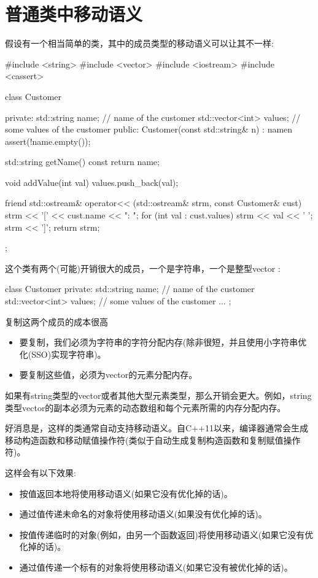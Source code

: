 \section{普通类中移动语义}
假设有一个相当简单的类，其中的成员类型的移动语义可以让其不一样:

\begin{cppcode}
#include <string>
#include <vector>
#include <iostream>
#include <cassert>

class Customer {
private:
	std::string name; // name of the customer
	std::vector<int> values; // some values of the customer
public:
	Customer(const std::string& n)
	: name{n} {
		assert(!name.empty());
	}

	std::string getName() const {
		return name;
	}

	void addValue(int val) {
		values.push_back(val);
	}

	friend std::ostream& operator<< (std::ostream& strm, const Customer& cust) {
		strm << '[' << cust.name << ": ";
		for (int val : cust.values) {
			strm << val << ' ';
		}
		strm << ']';
		return strm;
	}
};
\end{cppcode}

这个类有两个(可能)开销很大的成员，一个是字符串，一个是整型vector :

\begin{cppcode}
class Customer {
private:
	std::string name; // name of the customer
	std::vector<int> values; // some values of the customer
	...
};
\end{cppcode}

复制这两个成员的成本很高

\begin{itemize}
	\item 要复制，我们必须为字符串的字符分配内存(除非很短，并且使用小字符串优化(SSO)实现字符串)。
	\item 要复制这些值，必须为vector的元素分配内存。
\end{itemize}

如果有string类型的vector或者其他大型元素类型，那么开销会更大。例如，string类型vector的副本必须为元素的动态数组和每个元素所需的内存分配内存。

好消息是，这样的类通常自动支持移动语义。自C++11以来，编译器通常会生成移动构造函数和移动赋值操作符(类似于自动生成复制构造函数和复制赋值操作符)。

这样会有以下效果:

\begin{itemize}
	\item 按值返回本地将使用移动语义(如果它没有优化掉的话)。
	\item 通过值传递未命名的对象将使用移动语义(如果没有优化掉的话)。
	\item 按值传递临时的对象(例如，由另一个函数返回)将使用移动语义(如果它没有优化掉的话)。
	\item 通过值传递一个标有的对象将使用移动语义(如果它没有被优化掉的话)。
\end{itemize}

